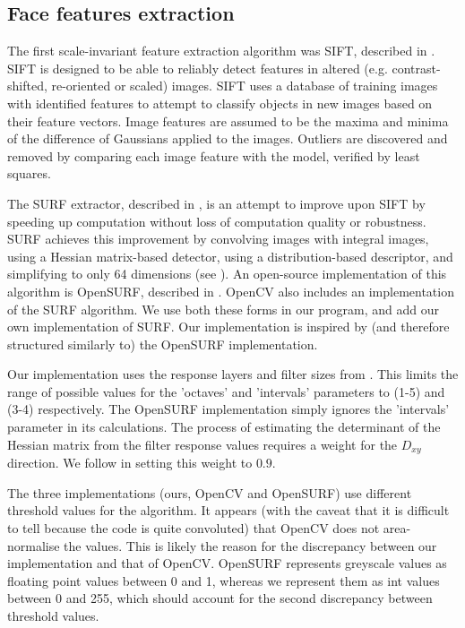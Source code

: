 \subsection{Face features extraction}

The first scale-invariant feature extraction algorithm was SIFT, described in \cite{SIFT}. SIFT is designed to be able to reliably detect features in altered (e.g. contrast-shifted, re-oriented or scaled) images. SIFT uses a database of training images with identified features to attempt to classify objects in new images based on their feature vectors. Image features are assumed to be the maxima and minima of the difference of Gaussians applied to the images. Outliers are discovered and removed by comparing each image feature with the model, verified by least squares.

The SURF extractor, described in \cite{SURF}, is an attempt to improve upon SIFT by speeding up computation without loss of computation quality or robustness. SURF achieves this improvement by convolving images with integral images, using a Hessian matrix-based detector, using a distribution-based descriptor, and simplifying to only 64 dimensions (see \cite{SURF}). An open-source implementation of this algorithm is OpenSURF, described in \cite{OpenSURF}. OpenCV also includes an implementation of the SURF algorithm. We use both these forms in our program, and add our own implementation of SURF. Our implementation is inspired by (and therefore structured similarly to) the OpenSURF implementation.

Our implementation uses the response layers and filter sizes from \cite{SURF}. This limits the range of possible values for the 'octaves' and 'intervals' parameters to (1-5) and (3-4) respectively. The OpenSURF implementation simply ignores the 'intervals' parameter in its calculations. The process of estimating the determinant of the Hessian matrix from the filter response values requires a weight for the $D_{xy}$ direction. We follow \cite{SURF} in setting this weight to $0.9$.

The three implementations (ours, OpenCV and OpenSURF) use different threshold values for the algorithm. It appears (with the caveat that it is difficult to tell because the code is quite convoluted) that OpenCV does not area-normalise the values. This is likely the reason for the discrepancy between our implementation and that of OpenCV. OpenSURF represents greyscale values as floating point values between 0 and 1, whereas we represent them as int values between 0 and 255, which should account for the second discrepancy between threshold values.

